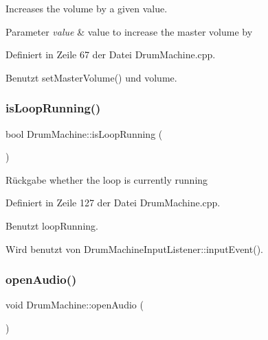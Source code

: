 Increases the volume by a given value. 
\begin{DoxyParams}{Parameter}
{\em value} & value to increase the master volume by \\
\hline
\end{DoxyParams}


Definiert in Zeile 67 der Datei Drum\+Machine.\+cpp.



Benutzt set\+Master\+Volume() und volume.

\mbox{\label{class_drum_machine_aaa0c2e00a5009b239aac709c37602c7d}} 
\subsubsection{\texorpdfstring{is\+Loop\+Running()}{isLoopRunning()}}
{\footnotesize\ttfamily bool Drum\+Machine\+::is\+Loop\+Running (\begin{DoxyParamCaption}{ }\end{DoxyParamCaption})}

\begin{DoxyReturn}{Rückgabe}
whether the loop is currently running 
\end{DoxyReturn}


Definiert in Zeile 127 der Datei Drum\+Machine.\+cpp.



Benutzt loop\+Running.



Wird benutzt von Drum\+Machine\+Input\+Listener\+::input\+Event().

\mbox{\label{class_drum_machine_afd65a07ff84b6c7854ddd9ee3a529382}} 
\subsubsection{\texorpdfstring{open\+Audio()}{openAudio()}}
{\footnotesize\ttfamily void Drum\+Machine\+::open\+Audio (\begin{DoxyParamCaption}{ }\end{DoxyParamCaption})\hspace{0.3cm}{\ttfamily [private]}}



